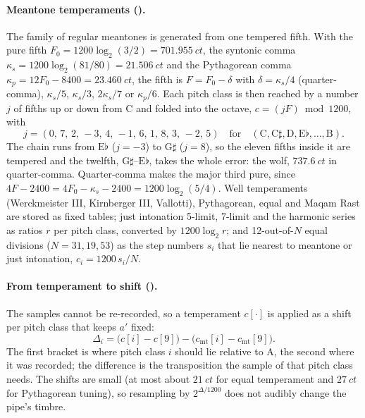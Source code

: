 \paragraph{Meantone temperaments ().} The family of regular meantones is generated from one
tempered fifth. With the pure fifth $F_0 = 1200\log_2(3/2) = \SI{701.955}{ct}$, the syntonic comma
$\kappa_s = 1200\log_2(81/80) = \SI{21.506}{ct}$ and the Pythagorean comma $\kappa_p = 12F_0 - 8400 =
\SI{23.460}{ct}$, the fifth is $F = F_0 - \delta$ with $\delta = \kappa_s/4$ (quarter-comma), $\kappa_s/5$,
$\kappa_s/3$, $2\kappa_s/7$ or $\kappa_p/6$. Each pitch class is then reached by a number $j$ of fifths up or down from
C and folded into the octave, $c = (jF) \bmod 1200$, with
\begin{equation}
  j = (0,\,7,\,2,\,-3,\,4,\,-1,\,6,\,1,\,8,\,3,\,-2,\,5)\quad\text{for}\quad (\mathrm{C},\mathrm{C}\sharp,\mathrm{D},\mathrm{E}\flat,\dots,\mathrm{B}).
\end{equation}
The chain runs from $\mathrm{E}\flat$ ($j=-3$) to $\mathrm{G}\sharp$ ($j=8$), so the eleven fifths inside it are
tempered and the twelfth, $\mathrm{G}\sharp$--$\mathrm{E}\flat$, takes the whole error: the wolf, $\SI{737.6}{ct}$ in
quarter-comma. Quarter-comma makes the major third pure, since $4F - 2400 = 4F_0 - \kappa_s - 2400 = 1200\log_2(5/4)$.
Well temperaments (Werckmeister III, Kirnberger III, Vallotti), Pythagorean, equal and Maqam Rast are stored as
fixed tables; just intonation 5-limit, 7-limit and the harmonic series as ratios $r$ per pitch class, converted by
$1200\log_2 r$; and 12-out-of-$N$ equal divisions ($N = 31, 19, 53$) as the step numbers $s_i$ that lie nearest to
meantone or just intonation, $c_i = 1200\,s_i/N$.

\paragraph{From temperament to shift ().} The samples cannot be re-recorded, so a temperament
$c[\cdot]$ is applied as a shift per pitch class that keeps $a'$ fixed:
\begin{equation}
  \Delta_i = \bigl(c[i]-c[9]\bigr) - \bigl(c_\mathrm{mt}[i]-c_\mathrm{mt}[9]\bigr).
\end{equation}
The first bracket is where pitch class $i$ should lie relative to A, the second where it was recorded; the
difference is the transposition the sample of that pitch class needs. The shifts are small (at most about $\SI{21}{ct}$ for equal
temperament and $\SI{27}{ct}$ for Pythagorean tuning), so resampling by $2^{\Delta/1200}$ does not audibly change the
pipe's timbre.

